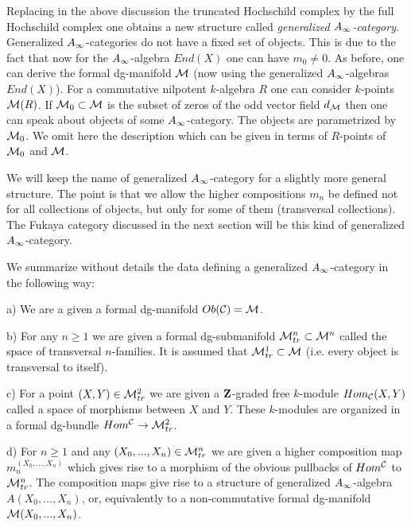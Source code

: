 \documentclass[a4paper,12pt]{article}
\begin{document}
Replacing in the above discussion the truncated Hochschild complex
by the full Hochschild complex one obtains a new structure called
{\it generalized $A_{\infty}$-category}. Generalized $A_{\infty}$-categories do not
have a fixed set of objects. This is due to the fact that now for
the $A_{\infty}$-algebra $End(X)$ one can have $m_0\ne 0$.
As before, one can derive the formal dg-manifold ${\cal M}$ 
(now using the generalized $A_{\infty}$-algebras $End(X)$). For a commutative
nilpotent $k$-algebra  $R$ one can consider
$k$-points ${\cal M}(R)$. 
If ${\cal M}_0\subset {\cal M}$ is the
subset of zeros of the odd vector field $d_{\cal M}$ then one can speak
about objects of some $A_{\infty}$-category.  The objects are parametrized by ${\cal M}_0$.
We omit here the description which can be given
in terms of $R$-points of  ${\cal M}_0$ and ${\cal M}$.












We will keep the name of generalized $A_{\infty}$-category
for a slightly more general structure. The point
is that we allow the higher compositions $m_n$  be defined not for all
collections of objects, but only for some of them
(transversal collections). The Fukaya category discussed
in the next section will be this kind of generalized $A_{\infty}$-category.

We  summarize without details the data defining a generalized $A_{\infty}$-category 
in the following way:

a) We are a given a formal dg-manifold  $Ob({\cal C})={\cal M}$.

b) For any $n\ge 1$ we are given a formal dg-submanifold 
${\cal M}^n_{tr}\subset {\cal M}^n$ called the space of transversal $n$-families.
It is assumed that ${\cal M}^1_{tr}\subset {\cal M}$ (i.e.
every object is transversal to itself).

c) For a point  $(X,Y)\in {\cal M}^2_{tr}$ we are given a ${\bf Z}$-graded
free $k$-module $Hom_{\cal C}(X,Y)$ called a space of morphisms between
$X$ and $Y$. These $k$-modules are organized in a formal dg-bundle
$Hom^{\cal C}\to {\cal M}^2_{tr}$.

d) For $n\ge 1$ and any  $(X_0,...,X_n)\in {\cal M}^n_{tr} $ we are given
a higher composition map $m_n^{(X_0,...,X_n)}$ which gives rise to a morphism
of the obvious pullbacks of $Hom^{\cal C}$  to ${\cal M}^n_{tr}$.
The  composition maps
give rise to a structure of generalized $A_{\infty}$-algebra $A(X_0,...,X_n)$,
or, equivalently to a non-commutative formal 
dg-manifold ${\cal M}(X_0,...,X_n)$.
\end{document}
